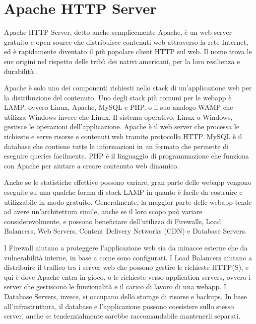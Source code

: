 \section{Apache HTTP Server}
Apache HTTP Server, detto anche semplicemente Apache, è un web server gratuito e open-source che distribuisce contenuti web attraverso la rete Internet, ed è rapidamente diventato il più popolare client HTTP sul web. Il nome trova le sue origini nel rispetto delle tribù dei nativi americani, per la loro resilienza e durabilità \cite{Apache, Apache_HTTP_Server_Docs}.

Apache è solo uno dei componenti richiesti nello stack di un'applicazione web per la distribuzione del contenuto. Uno degli stack più comuni per le webapp è LAMP, ovvero Linux, Apache, MySQL e PHP, o il suo analogo WAMP che utilizza Windows invece che Linux. Il sistema operativo, Linux o Windows, gestisce le operazioni dell'applicazione. Apache è il web server che processa le richieste e serve risorse e contenuti web tramite protocollo HTTP. MySQL è il database che contiene tutte le informazioni in un formato che permette di eseguire queries facilmente. PHP è il linguaggio di programmazione che funziona con Apache per aiutare a creare contenuto web dinamico.

Anche se le statistiche effettive possono variare, gran parte delle webapp vengono eseguite su una qualche forma di stack LAMP in quanto è facile da costruire e utilizzabile in modo gratuito. Generalmente, la maggior parte delle webapp tende ad avere un'architettura simile, anche se il loro scopo può variare considerevolmente, e possono beneficiare dell'utilizzo di Firewalls, Load Balancers, Web Servers, Content Delivery Networks (CDN) e Database Servers.

I Firewall aiutano a proteggere l'applicazione web sia da minacce esterne che da vulnerabilità interne, in base a come sono configurati. I Load Balancers aiutano a distribuire il traffico tra i server web che possono gestire le richieste HTTP(S), e qui è dove Apache entra in gioco, o le richieste verso application servers, ovvero i server che gestiscono le funzionalità e il carico di lavoro di una webapp. I Database Servers, invece, si occupano dello storage di risorse e backups. In base all'infrastruttura, il database e l'applicazione possono coesistere sullo stesso server, anche se tendenzialmente sarebbe raccomandabile mantenerli separati.

